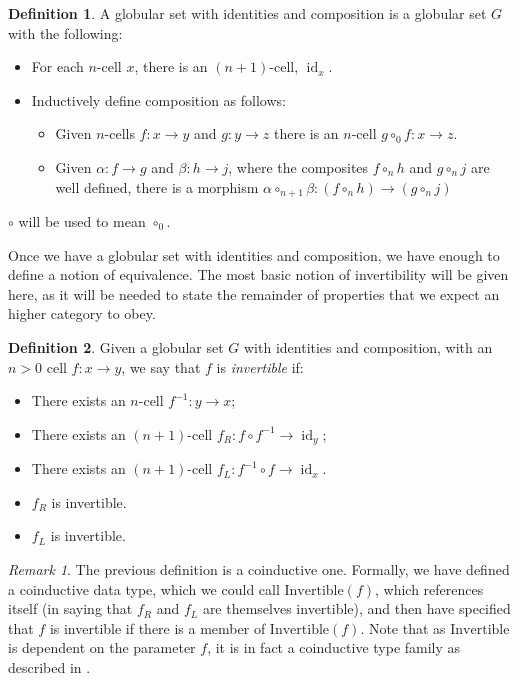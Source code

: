 \documentclass{article}
\renewcommand{\comment}[1]{\todo[color=green!40]{#1}}
\theoremstyle{definition}
\newtheorem{definition}{Definition}
\theoremstyle{remark}
\newtheorem{remark}{Remark}
\DeclareMathOperator{\id}{id}
\newcommand{\inv}[1]{#1^{-1}}
\begin{document}
\begin{definition}
  A globular set with identities and composition is a globular set \(G\) with the following:
  \begin{itemize}
  \item For each \(n\)-cell \(x\), there is an \((n+1)\)-cell, \(\id_x\).
  \item Inductively define composition as follows:
    \begin{itemize}
    \item Given \(n\)-cells \(f: x \to y\) and \(g: y \to z\) there is
      an \(n\)-cell \(g \circ_0 f: x \to z\).
    \item Given \(\alpha: f \to g\) and \(\beta: h \to j\), where the composites \(f \circ_n h\) and \(g \circ_n j\) are well defined, there is a morphism \(\alpha \circ_{n+1} \beta: (f \circ_n h) \to (g \circ_n j)\)
    \end{itemize}
  \end{itemize}
  \(\circ\) will be used to mean \(\circ_0\).\comment{Should I write \(\otimes\) for \(\circ_1\)}
\end{definition}

Once we have a globular set with identities and composition, we have enough to define a notion of equivalence. The most basic notion of invertibility will be given here, as it will be needed to state the remainder of properties that we expect an higher category to obey.

\begin{definition}
  Given a globular set \(G\) with identities and composition, with an \(n > 0\) cell \(f : x \to y\), we say that \(f\) is \emph{invertible} if:
  \begin{itemize}
  \item There exists an \(n\)-cell \(\inv f : y \to x\);
  \item There exists an \((n+1)\)-cell \(f_R: f \circ \inv f \to \id_y\);
  \item There exists an \((n+1)\)-cell \(f_L: \inv f \circ f \to \id_x\).
  \item \(f_R\) is invertible.
  \item \(f_L\) is invertible.
  \end{itemize}
\end{definition}

\begin{remark}
  The previous definition is a coinductive one. Formally, we have defined a coinductive data type, which we could call \(\text{Invertible}(f)\), which references itself (in saying that \(f_R\) and \(f_L\) are themselves invertible), and then have specified that \(f\) is invertible if there is a member of \(\text{Invertible}(f)\). Note that as \(\text{Invertible}\) is dependent on the parameter \(f\), it is in fact a coinductive type family as described in .
\end{remark}
\end{document}
